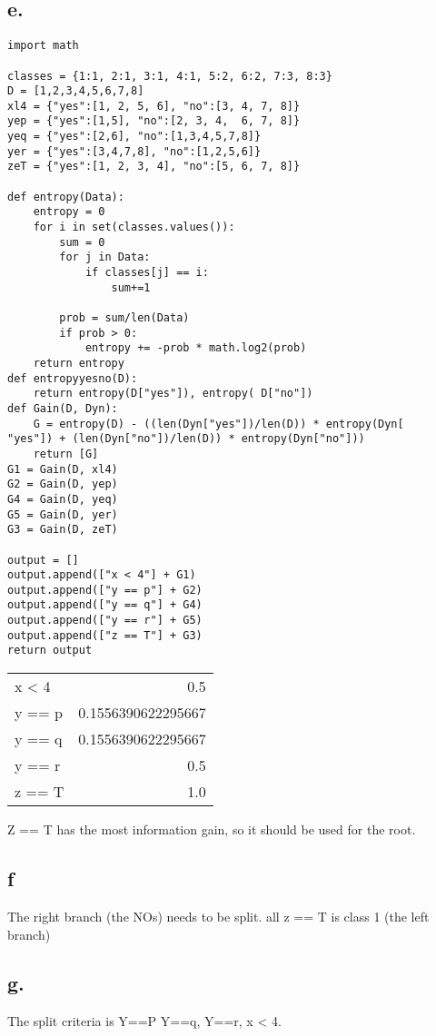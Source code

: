 \documentclass[11pt]{article}
\begin{document}
\subsection*{e.}
\label{sec:org88f13ef}
\begin{verbatim}
import math

classes = {1:1, 2:1, 3:1, 4:1, 5:2, 6:2, 7:3, 8:3}
D = [1,2,3,4,5,6,7,8]
xl4 = {"yes":[1, 2, 5, 6], "no":[3, 4, 7, 8]}
yep = {"yes":[1,5], "no":[2, 3, 4,  6, 7, 8]}
yeq = {"yes":[2,6], "no":[1,3,4,5,7,8]}
yer = {"yes":[3,4,7,8], "no":[1,2,5,6]}
zeT = {"yes":[1, 2, 3, 4], "no":[5, 6, 7, 8]}

def entropy(Data):
    entropy = 0
    for i in set(classes.values()):
        sum = 0
        for j in Data:
            if classes[j] == i:
                sum+=1

        prob = sum/len(Data)
        if prob > 0:
            entropy += -prob * math.log2(prob)
    return entropy
def entropyyesno(D):
    return entropy(D["yes"]), entropy( D["no"])
def Gain(D, Dyn):
    G = entropy(D) - ((len(Dyn["yes"])/len(D)) * entropy(Dyn[
"yes"]) + (len(Dyn["no"])/len(D)) * entropy(Dyn["no"]))
    return [G]
G1 = Gain(D, xl4)
G2 = Gain(D, yep)
G4 = Gain(D, yeq)
G5 = Gain(D, yer)
G3 = Gain(D, zeT)

output = []
output.append(["x < 4"] + G1)
output.append(["y == p"] + G2)
output.append(["y == q"] + G4)
output.append(["y == r"] + G5)
output.append(["z == T"] + G3)
return output
\end{verbatim}

\begin{center}
\begin{tabular}{lr}
x < 4 & 0.5\\
y == p & 0.1556390622295667\\
y == q & 0.1556390622295667\\
y == r & 0.5\\
z == T & 1.0\\
\end{tabular}
\end{center}

Z == T has the most information gain, so it should be used for the root.
\subsection*{f}
\label{sec:org455d1a0}
The right branch (the NOs) needs to be split. all z == T is class 1 (the left branch)
\subsection*{g.}
\label{sec:orga826d53}
The split criteria is  Y==P  Y==q, Y==r, x < 4.
\end{document}
